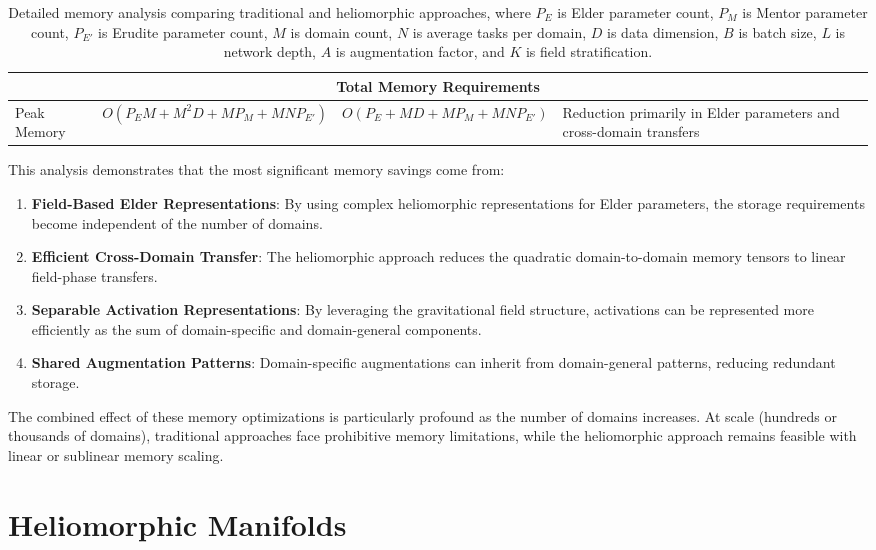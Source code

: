 \begin{definition}
\begin{theorem}
\begin{table}[h]
\begin{tabular}{|p{3.5cm}|p{3.5cm}|p{3.5cm}|p{3.5cm}|}
\hline
\multicolumn{4}{|c|}{\textbf{Total Memory Requirements}} \\
\hline
Peak Memory & $O(P_E M + M^2 D + MP_M + MNP_{E'})$ & $O(P_E + MD + MP_M + MNP_{E'})$ & Reduction primarily in Elder parameters and cross-domain transfers \\
\hline
\end{tabular}
\caption{Detailed memory analysis comparing traditional and heliomorphic approaches, where $P_E$ is Elder parameter count, $P_M$ is Mentor parameter count, $P_{E'}$ is Erudite parameter count, $M$ is domain count, $N$ is average tasks per domain, $D$ is data dimension, $B$ is batch size, $L$ is network depth, $A$ is augmentation factor, and $K$ is field stratification.}
\label{tab:memory_analysis}
\end{table}

This analysis demonstrates that the most significant memory savings come from:

\begin{enumerate}
    \item \textbf{Field-Based Elder Representations}: By using complex heliomorphic representations for Elder parameters, the storage requirements become independent of the number of domains.
    
    \item \textbf{Efficient Cross-Domain Transfer}: The heliomorphic approach reduces the quadratic domain-to-domain memory tensors to linear field-phase transfers.
    
    \item \textbf{Separable Activation Representations}: By leveraging the gravitational field structure, activations can be represented more efficiently as the sum of domain-specific and domain-general components.
    
    \item \textbf{Shared Augmentation Patterns}: Domain-specific augmentations can inherit from domain-general patterns, reducing redundant storage.
\end{enumerate}

The combined effect of these memory optimizations is particularly profound as the number of domains increases. At scale (hundreds or thousands of domains), traditional approaches face prohibitive memory limitations, while the heliomorphic approach remains feasible with linear or sublinear memory scaling.

\section{Heliomorphic Manifolds}


\end{theorem}
\end{definition}
